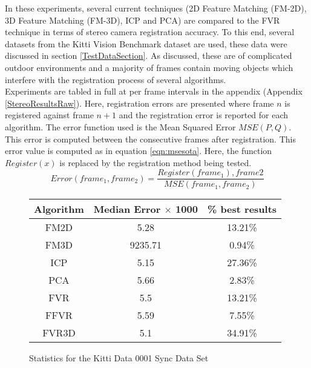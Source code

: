 	
In these experiments, several current techniques (2D Feature Matching (FM-2D), 3D Feature Matching (FM-3D), ICP and PCA) are compared to the FVR technique in terms of stereo camera registration accuracy. To this end, several datasets from the Kitti Vision Benchmark dataset are used, these data were discussed in section \ref{TestDataSection}. As discussed, these are of complicated outdoor environments and a majority of frames contain moving objects which interfere with the registration process of several algorithms. \\

Experiments are tabled in full at per frame intervals in the appendix (Appendix \ref{StereoResultsRaw}). Here, registration errors are presented where frame $n$ is registered against frame $n+1$ and the registration error is reported for each algorithm. The error function used is the Mean Squared Error $MSE(P,Q)$. This error is computed between the consecutive frames after registration. This error value is computed as in equation \ref{eqn:msesota}. Here, the function $Register(x)$ is replaced by the registration method being tested. \\

\begin{equation} \label{eqn:msesota}
Error(frame_1, frame_2) =  \frac{Register(frame_1), frame2}{MSE(frame_1,frame_2)}
\end{equation}



\begin{figure}
\centering
\begin{tabular}{ccc}
\hline
\textbf{Algorithm} & \textbf{Median Error $\times$ 1000} & \textbf{\% best results}\\ \hline
FM2D	& 5.28 & 13.21\%\\
FM3D	& 9235.71 & 0.94\%\\
ICP	& 5.15 & 27.36\%\\
PCA	& 5.66 & 2.83\%\\
FVR	& 5.5 & 13.21\%\\
FFVR	& 5.59 & 7.55\%\\
FVR3D	& 5.1 & 34.91\%\\
\end{tabular}
\caption{Statistics for the Kitti Data 0001 Sync Data Set}
\label{tab:kittidata0001sync}
\end{figure} 

